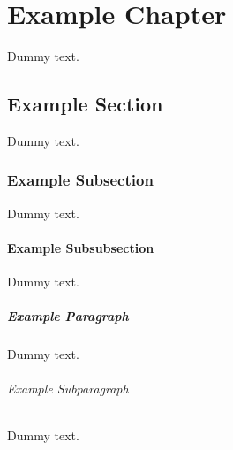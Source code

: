 \chapter{Example Chapter}

Dummy text.

\section{Example Section}

Dummy text.

\subsection{Example Subsection}

Dummy text.

\subsubsection{Example Subsubsection}

Dummy text.

\paragraph{Example Paragraph}

Dummy text.

\subparagraph{Example Subparagraph}

Dummy text.
